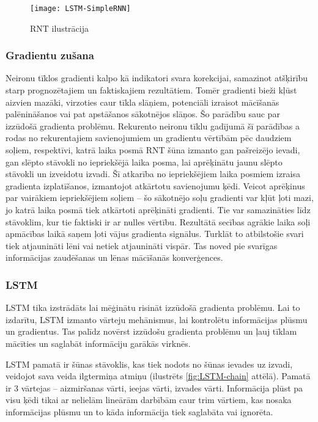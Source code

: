 \begin{figure}[H]
\texttt{[image: LSTM-SimpleRNN]}
\caption{RNT ilustrācija \cite{ChristopherOlahLSTM}}
\label{fig:LSTM-SimpleRNN}
\end{figure}

\subsubsection{Gradientu zušana}
Neironu tīklos gradienti kalpo kā indikatori svara korekcijai, samazinot atšķirību starp prognozētajiem un faktiskajiem rezultātiem. Tomēr gradienti bieži kļūst aizvien mazāki, virzoties caur tīkla slāņiem, potenciāli izraisot mācīšanās palēnināšanos vai pat apstāšanos sākotnējos slāņos. Šo parādību sauc par izzūdošā gradienta problēmu. Rekurento neironu tīklu gadījumā šī parādības a rodas no rekurentajiem savienojumiem un gradientu vērtībām pēc daudziem soļiem, respektīvi, katrā laika posmā RNT šūna izmanto gan pašreizējo ievadi, gan slēpto stāvokli no iepriekšējā laika posma, lai aprēķinātu jaunu slēpto stāvokli un izveidotu izvadi. Šī atkarība no iepriekšējiem laika posmiem izraisa gradienta izplatīšanos, izmantojot atkārtotu savienojumu ķēdi. Veicot aprēķinus par vairākiem iepriekšējiem soļiem – šo sākotnējo soļu gradienti var kļūt ļoti mazi, jo katrā laika posmā tiek atkārtoti aprēķināti gradienti. Tie var samazināties līdz stāvoklim, kur tie faktiski ir ar nulles vērtību. Rezultātā secības agrākie laika soļi apmācības laikā saņem ļoti vājus gradienta signālus. Turklāt to atbilstošie svari tiek atjaunināti lēni vai netiek atjaunināti vispār. Tas noved pie svarīgas informācijas zaudēšanas un lēnas mācīšanās konverģences.

\subsubsection{LSTM}
LSTM tika izstrādāts lai mēģinātu risināt izzūdošā gradienta problēmu. Lai to izdarītu, LSTM izmanto vārteju mehānismus, lai kontrolētu informācijas plūsmu un gradientus. Tas palīdz novērst izzūdošu gradienta problēmu un ļauj tīklam mācīties un saglabāt informāciju garākās virknēs.

LSTM pamatā ir šūnas stāvoklis, kas tiek nodots no šūnas ievades uz izvadi, veidojot sava veida ilgtermiņa atmiņu (ilustrēts \ref{fig:LSTM-chain} attēlā). Pamatā ir 3 vārtejas – aizmiršanas vārti, ieejas vārti, izvades vārti. Informācija plūst pa visu ķēdi tikai ar nelielām lineārām darbībām caur trim vārtiem, kas nosaka informācijas plūsmu un to kāda informācija tiek saglabāta vai ignorēta.

